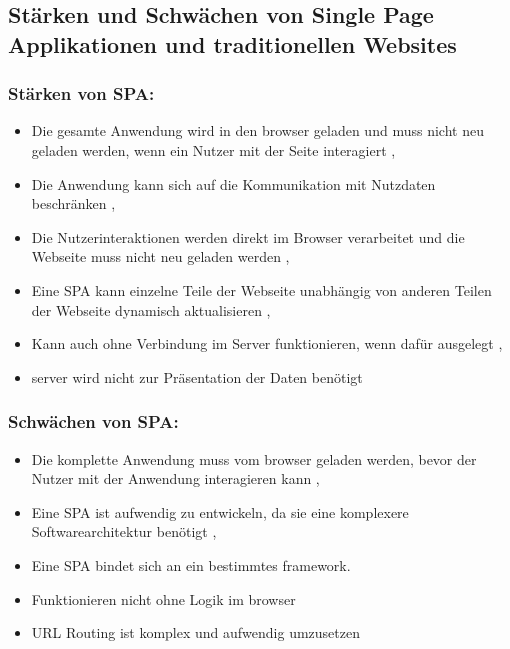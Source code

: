 \subsection{Stärken und Schwächen von Single Page Applikationen und traditionellen Websites}

\subsubsection*{Stärken von \ac{SPA}:}
\begin{itemize}
  \item Die gesamte Anwendung wird in den \gls{browser} geladen und muss nicht neu geladen werden, wenn ein Nutzer mit der Seite interagiert \cite{Smith2022}, \cite{Flanagan2011}
  \item Die Anwendung kann sich auf die Kommunikation mit Nutzdaten beschränken \cite{Smith2022}, \cite{Flanagan2011}
  \item Die Nutzerinteraktionen werden direkt im Browser verarbeitet und die Webseite muss nicht neu geladen werden \cite{Smith2022}, \cite{Flanagan2011}
  \item Eine \ac{SPA} kann einzelne Teile der Webseite unabhängig von anderen Teilen der Webseite dynamisch aktualisieren \cite{Smith2022}, \cite{Irudayaraj2019}
  \item Kann auch ohne Verbindung im Server funktionieren, wenn dafür ausgelegt \cite{Smith2022}, \cite{Gavrila2019}
  \item \gls{server} wird nicht zur Präsentation der Daten benötigt \cite{Flanagan2011}
\end{itemize}


\subsubsection*{Schwächen von \ac{SPA}:}

\begin{itemize}
  \item Die komplette Anwendung muss vom \gls{browser} geladen werden, bevor der Nutzer mit der Anwendung interagieren kann \cite{Smith2022}, \cite{Gavrila2019}
  \item Eine \ac{SPA} ist aufwendig zu entwickeln, da sie eine komplexere Softwarearchitektur benötigt \cite{Smith2022}, \cite{Flanagan2011}
  \item Eine \ac{SPA} bindet sich an ein bestimmtes \gls{framework}. \cite{Smith2022}
  \item Funktionieren nicht ohne Logik im \gls{browser} \cite{Smith2022}
  \item \ac{URL} Routing ist komplex und aufwendig umzusetzen \cite{Smith2022}
\end{itemize}

